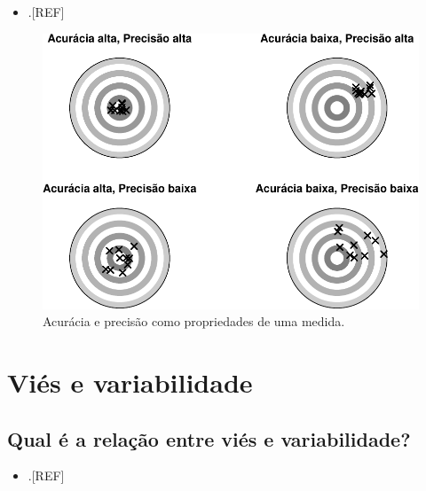 \documentclass[
  a4paper,
]{book}
\providecommand{\tightlist}{%
  \setlength{\itemsep}{0pt}\setlength{\parskip}{0pt}}
\begin{document}
\begin{itemize}
\tightlist
\item
  .{[}REF{]}
\end{itemize}

\begin{figure}

{\centering \includegraphics{Ciencia-com-R_files/figure-latex/acuracia-precisao-1} 

}

\caption{Acurácia e precisão como propriedades de uma medida.}\label{fig:acuracia-precisao}
\end{figure}

\hypertarget{vies-variabilidade}{%
\section{Viés e variabilidade}\label{vies-variabilidade}}

\hypertarget{qual-uxe9-a-relauxe7uxe3o-entre-viuxe9s-e-variabilidade}{%
\subsection{Qual é a relação entre viés e variabilidade?}\label{qual-uxe9-a-relauxe7uxe3o-entre-viuxe9s-e-variabilidade}}

\begin{itemize}
\tightlist
\item
  .{[}REF{]}
\end{itemize}
\end{document}
